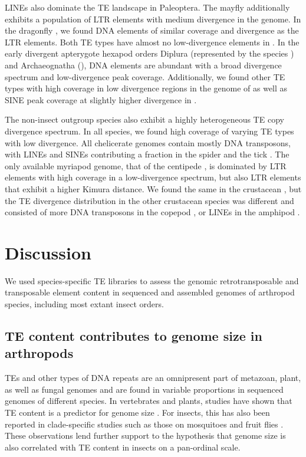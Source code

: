 LINEs also dominate the TE landscape in Paleoptera. The mayfly
 additionally exhibits a population of LTR elements
with medium divergence in the genome. In the dragonfly , we found DNA elements of similar coverage and divergence as the
LTR elements. Both TE types have almost no low-divergence elements in
. In the early divergent apterygote hexapod orders
Diplura (represented by the species ) and
Archaeognatha (), DNA elements are abundant
with a broad divergence spectrum and low-divergence peak coverage.
Additionally, we found other TE types with high coverage in low
divergence regions in the genome of  as well as
SINE peak coverage at slightly higher divergence in .

The non-insect outgroup species also exhibit a highly heterogeneous TE
copy divergence spectrum. In all species, we found high coverage of
varying TE types with low divergence. All chelicerate genomes contain
mostly DNA transposons, with LINEs and SINEs contributing a fraction in
the spider  and the tick . The only available myriapod genome, that of the centipede
, is dominated by LTR elements with high
coverage in a low-divergence spectrum, but also LTR elements that
exhibit a higher Kimura distance. We found the same in the crustacean
, but the TE divergence distribution in the other
crustacean species was different and consisted of more DNA transposons
in the copepod , or LINEs in the amphipod
.

\section{Discussion}\label{discussion}

We used species-specific TE libraries to assess the genomic
retrotransposable and transposable element content in sequenced and
assembled genomes of arthropod species, including most extant insect
orders.

\subsection{TE content contributes to genome size in
arthropods}\label{te-content-contributes-to-genome-size-in-arthropods}

TEs and other types of DNA repeats are an omnipresent part of metazoan,
plant, as well as fungal genomes and are found in variable proportions
in sequenced genomes of different species. In vertebrates and plants,
studies have shown that TE content is a predictor for genome size
\citep{Chalopin2015,Staton2015}. For insects, this has also been
reported in clade-specific studies such as those on mosquitoes
\citep{Neafsey2015} and  fruit flies
\citep{Sessegolo2016}. These observations lend further support to the
hypothesis that genome size is also correlated with TE content in
insects on a pan-ordinal scale.

